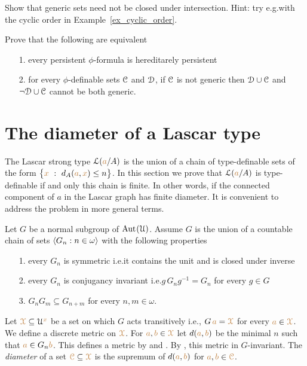\begin{exercise}
  Show that generic sets need not be closed under intersection.
  Hint: try e.g.\@ with the cyclic order in Example~\ref{ex_cyclic_order}.
\end{exercise}

\begin{exercise}
  Prove that the following are equivalent
  \begin{itemize}
    \item[1.] every persistent $\phi$-formula is hereditarely persistent
    \item[2.] for every $\phi$-definable sets $\EuScript C$ and $\EuScript D$, if $\EuScript C$ is not generic then $\EuScript D\cup\EuScript C$ and $\neg\EuScript D\cup\EuScript C$ cannot be both generic.
  \end{itemize}
\end{exercise}


\section{The diameter of a Lascar type}\label{newelski}

The Lascar strong type $\EuScript L({\color{brown} a}/A)$ is the union of a chain of type-definable sets of the form $\big\{{\color{brown} x}\ :\ d_A({\color{brown} a},{\color{brown} x})\le n\big\}$.
In this section we prove that $\EuScript L({\color{brown} a}/A)$ is type-definable if and only this chain is finite.
In other words, if the connected component of $a$ in the Lascar graph has finite diameter.
It is convenient to address the problem in more general terms.

Let $G$ be a normal subgroup of ${\rm Aut\kern.15ex}(\EuScript U)$.
Assume $G$ is the union of a countable chain of sets $\langle G_n:n\in\omega\rangle$ with the following properties
\begin{itemize}
  \item[1.] every $G_n$ is symmetric i.e.\@ it contains the unit and is closed under inverse
  \item[2.] every $G_n$ is conjugancy invariant i.e.\@ $g\,G_ng^{-1}=G_n$ for every $g\in G$
  \item[3.] $G_nG_m\subseteq  G_{n+m}$ for every $n,m\in\omega$.
\end{itemize}

Let ${\color{brown}\EuScript X}\subseteq\EuScript U^{\color{brown} x}$ be a set on which $G$ acts transitively i.e., $G\,{\color{brown} a}={\color{brown}\EuScript X}$ for every ${\color{brown} a}\in{\color{brown}\EuScript X}$.
We define a discrete metric on ${\color{brown}\EuScript X}$. 
For ${\color{brown} a},{\color{brown} b}\in{\color{brown}\EuScript X}$ let $d({\color{brown} a},{\color{brown} b})$ be the minimal $n$ such that ${\color{brown} a}\in G_n{\color{brown} b}$.
This defines a metric by  and .
By , this metric in $G$-invariant.
The \emph{diameter\/} of a set ${\color{brown}\EuScript C}\subseteq{\color{brown}\EuScript X}$ is the supremum of $d({\color{brown} a},{\color{brown} b})$ for ${\color{brown} a},{\color{brown} b}\in{\color{brown}\EuScript C}$.

